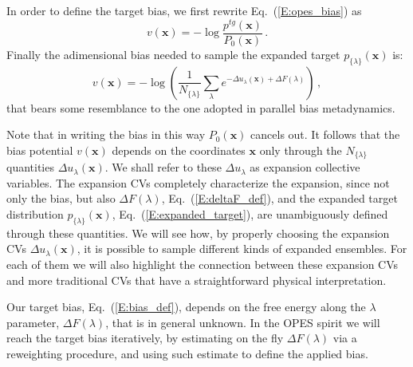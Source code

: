 \documentclass[aps,prx,reprint,superscriptaddress]{revtex4-1} %
\begin{document}
In order to define the target bias, we first rewrite Eq.~(\ref{E:opes_bias}) as
\begin{equation}
    v(\mathbf{x})=-\log \frac{p^{tg}(\mathbf{x})}{P_0(\mathbf{x})}\, .
\end{equation}
Finally the adimensional bias needed to sample the expanded target $p_{\{\lambda\}}(\mathbf{x})$ is:
\begin{equation}\label{E:bias_def}
   v(\mathbf{x})=-\log \left(\frac{1}{N_{\{\lambda\}}}\sum_\lambda e^{-\Delta u_\lambda(\mathbf{x})+\Delta F(\lambda)}\right)\, ,
\end{equation}
that bears some resemblance to the one adopted in parallel bias metadynamics\cite{Pfaendtner2015}.

Note that in writing the bias in this way $P_0(\mathbf{x})$ cancels out.
It follows that the bias potential $v(\mathbf{x})$ depends on the coordinates $\mathbf{x}$ only through the $N_{\{\lambda\}}$ quantities $\Delta u_\lambda (\mathbf{x})$.
We shall refer to these $\Delta u_\lambda$ as expansion collective variables.
The expansion CVs completely characterize the expansion, since not only the bias, but also $\Delta F(\lambda)$, Eq.~(\ref{E:deltaF_def}), and the expanded target distribution $p_{\{\lambda\}}(\mathbf{x})$, Eq.~(\ref{E:expanded_target}), are unambiguously defined through these quantities.
We will see how, by properly choosing the expansion CVs $\Delta u_\lambda (\mathbf{x})$, it is possible to sample different kinds of expanded ensembles.
For each of them we will also highlight the connection between these expansion CVs and more traditional CVs that have a straightforward physical interpretation.

Our target bias, Eq.~(\ref{E:bias_def}), depends on the free energy along the $\lambda$ parameter, $\Delta F(\lambda)$, that is in general unknown.
In the OPES spirit we will reach the target bias iteratively, by estimating on the fly $\Delta F(\lambda)$ via a reweighting procedure, and using such estimate to define the applied bias.

\end{document}

